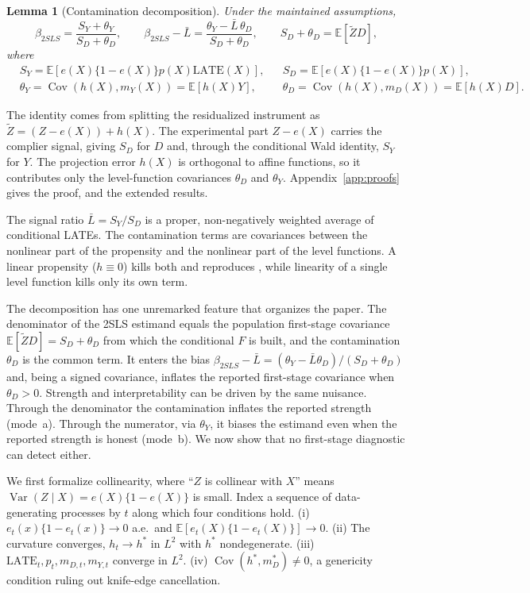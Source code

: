 \documentclass[11pt]{article}
\theoremstyle{plain}
\newtheorem{lemma}{Lemma}
\theoremstyle{definition}
\newcommand{\E}{\mathbb{E}}
\newcommand{\Cov}{\operatorname{Cov}}
\newcommand{\Var}{\operatorname{Var}}
\newcommand{\Lb}{\bar{L}}
\newcommand{\Zt}{\tilde{Z}}
\begin{document}
\begin{lemma}[Contamination decomposition]\label{lem:decomp}
Under the maintained assumptions,
\[
\beta_{2SLS}=\frac{S_Y+\theta_Y}{S_D+\theta_D},\qquad
\beta_{2SLS}-\Lb=\frac{\theta_Y-\Lb\,\theta_D}{S_D+\theta_D},\qquad S_D+\theta_D=\E[\Zt D],
\]
where
\[
\begin{aligned}
&S_Y=\E[e(X)\{1-e(X)\}p(X)\mathrm{LATE}(X)], && S_D=\E[e(X)\{1-e(X)\}p(X)],\\
&\theta_Y=\Cov(h(X),m_Y(X))=\E[h(X)Y], && \theta_D=\Cov(h(X),m_D(X))=\E[h(X)D].
\end{aligned}
\]
\end{lemma}

\noindent The identity comes from splitting the residualized instrument as $\Zt=(Z-e(X))+h(X)$. The experimental part $Z-e(X)$ carries the complier signal, giving $S_D$ for $D$ and, through the conditional Wald identity, $S_Y$ for $Y$. The projection error $h(X)$ is orthogonal to affine functions, so it contributes only the level-function covariances $\theta_D$ and $\theta_Y$. Appendix~\ref{app:proofs} gives the proof, and \citet{arora2026} the extended results.

The signal ratio $\Lb=S_Y/S_D$ is a proper, non-negatively weighted average of conditional LATEs. The contamination terms are covariances between the nonlinear part of the propensity and the nonlinear part of the level functions. A linear propensity ($h\equiv 0$) kills both and reproduces \citet{blandhol2022}, while linearity of a single level function kills only its own term.

The decomposition has one unremarked feature that organizes the paper. The denominator of the 2SLS estimand equals the population first-stage covariance $\E[\Zt D]=S_D+\theta_D$ from which the \citet{sw2016} conditional $F$ is built, and the contamination $\theta_D$ is the common term. It enters the bias $\beta_{2SLS}-\Lb=(\theta_Y-\Lb\theta_D)/(S_D+\theta_D)$ and, being a signed covariance, inflates the reported first-stage covariance when $\theta_D>0$. Strength and interpretability can be driven by the same nuisance. Through the denominator the contamination inflates the reported strength (mode~a). Through the numerator, via $\theta_Y$, it biases the estimand even when the reported strength is honest (mode~b). We now show that no first-stage diagnostic can detect either.

We first formalize collinearity, where ``$Z$ is collinear with $X$'' means $\Var(Z\mid X)=e(X)\{1-e(X)\}$ is small. Index a sequence of data-generating processes by $t$ along which four conditions hold. (i) $e_t(x)\{1-e_t(x)\}\to 0$ a.e.\ and $\E[e_t(X)\{1-e_t(X)\}]\to 0$. (ii) The curvature converges, $h_t\to h^\ast$ in $L^2$ with $h^\ast$ nondegenerate. (iii) $\mathrm{LATE}_t,p_t,m_{D,t},m_{Y,t}$ converge in $L^2$. (iv) $\Cov(h^\ast,m_D^\ast)\neq 0$, a genericity condition ruling out knife-edge cancellation.
\end{document}
